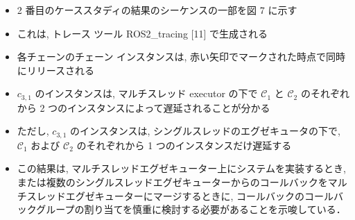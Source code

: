 \begin{frame}{}
    \begin{itemize}
        \item 2 番目のケーススタディの結果のシーケンスの一部を図 7 に示す
\item これは, トレース ツール ROS2\_tracing [11] で生成される
\item 各チェーンのチェーン インスタンスは, 赤い矢印でマークされた時点で同時にリリースされる
\item $c_{3,1}$ のインスタンスは, マルチスレッド executor の下で $\mathcal{C}_{1}$ と $\mathcal{C}_{2}$ のそれぞれから 2 つのインスタンスによって遅延されることが分かる
\item ただし, $c_{3,1}$ のインスタンスは, シングルスレッドのエグゼキュータの下で, $\mathcal{C}_{1}$ および $\mathcal{C}_{2}$ のそれぞれから 1 つのインスタンスだけ遅延する
\item この結果は, マルチスレッドエグゼキューター上にシステムを実装するとき, または複数のシングルスレッドエグゼキューターからのコールバックをマルチスレッドエグゼキューターにマージするときに, コールバックのコールバックグループの割り当てを慎重に検討する必要があることを示唆している．
    \end{itemize}
\end{frame}
